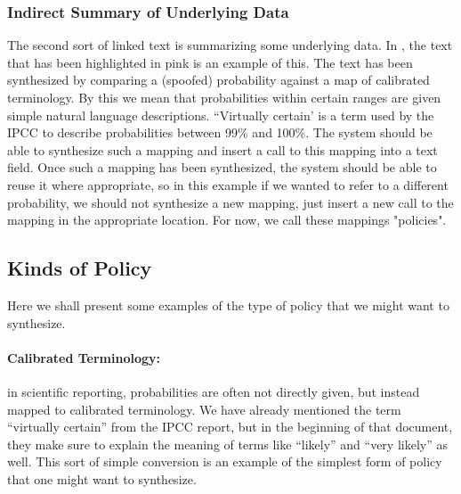 \subsubsection{Indirect Summary of Underlying Data}
The second sort of linked text is summarizing some underlying data. In ,
the text that has been highlighted in pink is an example of this. The text has been synthesized
by comparing a (spoofed) probability against a map of calibrated terminology. By this we mean that
probabilities within certain ranges are given simple natural language descriptions. ``Virtually certain'
is a term used by the IPCC to describe probabilities between 99\% and 100\%. The system should be able
to synthesize such a mapping and insert a call to this mapping into a text field. Once such a mapping
has been synthesized, the system should be able to reuse it where appropriate, so in this example if
we wanted to refer to a different probability, we should not synthesize a new mapping, just insert
a new call to the mapping in the appropriate location. For now, we call these mappings "policies".

\subsection{Kinds of Policy}
Here we shall present some examples of the type of policy that we might want to synthesize.

\paragraph{Calibrated Terminology:} in scientific reporting, probabilities are often not directly given, but instead
mapped to calibrated terminology. We have already mentioned the term ``virtually certain'' from the IPCC report, but in the beginning
of that document, they make sure to explain the meaning of terms like ``likely'' and ``very likely'' as well. This
sort of simple conversion is an example of the simplest form of policy that one might want to synthesize.